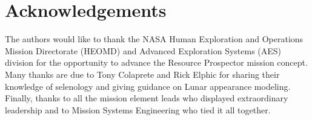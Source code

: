 \documentclass[twocolumn,letterpaper]{IEEEAerospaceCLS}  %
\begin{document}
\section{Acknowledgements}
The authors would like to thank the NASA Human Exploration and Operations Mission Directorate (HEOMD) and Advanced Exploration Systems (AES) division for the opportunity to advance the Resource Prospector mission concept.  Many thanks are due to Tony Colaprete and Rick Elphic for sharing their knowledge of selenology and giving guidance on Lunar appearance modeling.  Finally, thanks to all the mission element leads who displayed extraordinary leadership and to Mission Systems Engineering who tied it all together.  




\thebiography
\end{document}
